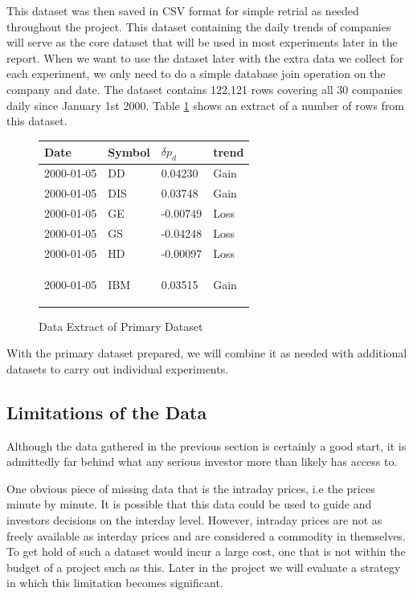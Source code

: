 \documentclass{report}
\begin{document}
This dataset was then saved in CSV format for simple retrial as needed throughout the project. This dataset containing the daily trends of companies will serve as the core dataset that will be used in most experiments later in the report. When we want to use the dataset later with the extra data we collect for each experiment, we only need to do a simple database join operation on the company and date. The dataset contains 122,121 rows covering all 30 companies daily since January 1st 2000. Table \ref{table:data-example-0} shows an extract of a number of rows from this dataset.

\begin{figure}[H]
\caption{Data Extract of Primary Dataset}
\begin{center}
  
    \begin{tabular}{l | l | l | l }
      Date & Symbol & $\delta p_{d}$ & trend \\ \hline
      2000-01-05 & DD  &	0.04230 	& Gain \\ \hline
      2000-01-05 & DIS &	0.03748 	& Gain \\ \hline
      2000-01-05 & GE  &	-0.00749 	& Loss \\ \hline
      2000-01-05 & GS  &	-0.04248 	& Loss \\ \hline
      2000-01-05 & HD  &	-0.00097 	& Loss \\ \hline
      2000-01-05 & IBM &	0.03515 	& Gain

    \label{table:data-example-0}
    \end{tabular}
\end{center}
\end{figure}

With the primary dataset prepared, we will combine it as needed with additional datasets to carry out individual experiments. 

\subsection{Limitations of the Data}

Although the data gathered in the previous section is certainly a good start, it is admittedly far behind what any serious investor more than likely has access to. 

One obvious piece of missing data that is the intraday prices, i.e the prices minute by minute. It is possible that this data could be used to guide and investors decisions on the interday level. However, intraday prices are not as freely available as interday prices and are considered a commodity in themselves. To get hold of such a dataset would incur a large cost, one that is not within the budget of a project such as this. Later in the project we will evaluate a strategy in which this limitation becomes significant.
\end{document}
